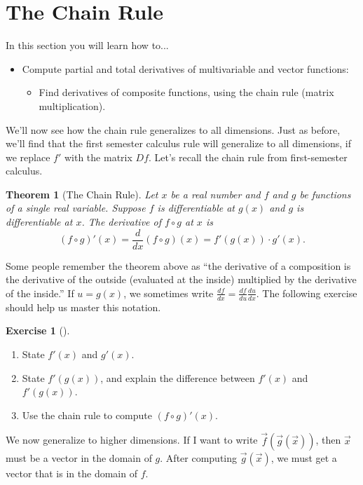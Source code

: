 \documentclass[10pt,]{book}
\theoremstyle{plain}
\newtheorem{theorem}{Theorem}[section]
\theoremstyle{definition}
\theoremstyle{definition}
\theoremstyle{definition}
\theoremstyle{definition}
\newtheorem{exploration}[project]{Exercise}
\theoremstyle{definition}
\numberwithin{equation}{section}
\newcommand{\ds}{\displaystyle}
\begin{document}
\section[{The Chain Rule}]{The Chain Rule}\label{section-23}
In this section you will learn how to...%
\leavevmode%
\begin{itemize}[label=\textbullet]
\item{}Compute partial and total derivatives of multivariable and vector functions:%
%
\begin{itemize}[label=$\circ$]
\item{}Find derivatives of composite functions, using the chain rule (matrix multiplication).%
\end{itemize}
\end{itemize}
We'll now see how the chain rule generalizes to all dimensions. Just as before, we'll find that the first semester calculus rule will generalize to all dimensions, if we replace \(f'\) with the matrix \(Df\). Let's recall the chain rule from first-semester calculus.%
\begin{theorem}[{The Chain Rule}]\label{theorem-2}
Let \(x\) be a real number and \(f\) and \(g\) be functions of a single real variable. Suppose \(f\) is differentiable at \(g(x)\) and \(g\) is differentiable at \(x\). The derivative of \(f\circ g\) at \(x\) is%
\begin{equation*}
(f\circ g)'(x) = \frac{d}{dx}(f\circ g)(x) = f'(g(x))\cdot g'(x).
\end{equation*}
%
\end{theorem}
Some people remember the theorem above as ``the derivative of a composition is the derivative of the outside (evaluated at the inside) multiplied by the derivative of the inside.'' If \(u=g(x)\), we sometimes write \(\ds \frac{df}{dx}=\frac{df}{du}\frac{du}{dx}\). The following exercise should help us master this notation.%
\begin{exploration}[]\label{prob_chain_rule_review}
\leavevmode%
\begin{enumerate}[font=\bfseries,label=(\alph*),ref=\alph*]
\item\label{task-333} State \(f'(x)\) and \(g'(x)\).%
\item\label{task-334} State \(f'(g(x))\), and explain the difference between \(f'(x)\) and \(f'(g(x))\).%
\item\label{task-335} Use the chain rule to compute \((f\circ g)'(x)\).%
\end{enumerate}
\end{exploration}
We now generalize to higher dimensions. If I want to write \(\vec f(\vec g(\vec x))\), then \(\vec x\) must be a vector in the domain of \(g\). After computing \(\vec g(\vec x)\), we must get a vector that is in the domain of \(f\).%
\end{document}
